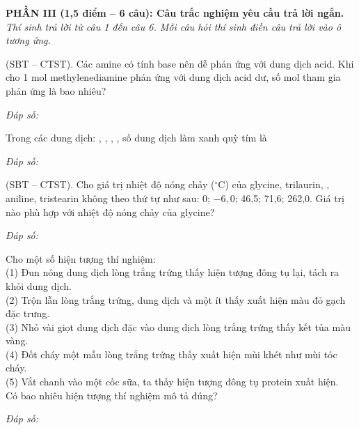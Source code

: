 \documentclass[11pt,a4paper]{article}
\def\loigiai#1{}
\begin{document}
\newpage

\vspace{0.15cm}
\noindent
\textbf{PHẦN III (1,5 điểm -- 6 câu): Câu trắc nghiệm yêu cầu trả lời ngắn.}\\
\textit{Thí sinh trả lời từ câu 1 đến câu 6. Mỗi câu hỏi thí sinh điền câu trả lời vào ô tương ứng.}

\setcounter{ex}{0}

\begin{ex}
(SBT -- CTST). Các amine có tính base nên dễ phản ứng với dung dịch acid. Khi cho 1 mol methylenediamine phản ứng với dung dịch acid  dư, số mol  tham gia phản ứng là bao nhiêu?
\loigiai{}
\end{ex}
\noindent\textit{Đáp số:} \dotfill\vspace{0.25cm}

\begin{ex}
Trong các dung dịch: , , , , số dung dịch làm xanh quỳ tím là
\loigiai{}
\end{ex}
\noindent\textit{Đáp số:} \dotfill\vspace{0.25cm}

\begin{ex}
(SBT -- CTST). Cho giá trị nhiệt độ nóng chảy ($^\circ$C) của glycine, trilaurin, , aniline, tristearin không theo thứ tự như sau: 0; $-6{,}0$; 46,5; 71,6; 262,0. Giá trị nào phù hợp với nhiệt độ nóng chảy của glycine?
\loigiai{}
\end{ex}
\noindent\textit{Đáp số:} \dotfill\vspace{0.25cm}

\begin{ex}
Cho một số hiện tượng thí nghiệm:\\
(1) Đun nóng dung dịch lòng trắng trứng thấy hiện tượng đông tụ lại, tách ra khỏi dung dịch.\\
(2) Trộn lẫn lòng trắng trứng, dung dịch  và một ít  thấy xuất hiện màu đỏ gạch đặc trưng.\\
(3) Nhỏ vài giọt dung dịch  đặc vào dung dịch lòng trắng trứng thấy kết tủa màu vàng.\\
(4) Đốt cháy một mẫu lòng trắng trứng thấy xuất hiện mùi khét như mùi tóc cháy.\\
(5) Vắt chanh vào một cốc sữa, ta thấy hiện tượng đông tụ protein xuất hiện.\\
Có bao nhiêu hiện tượng thí nghiệm mô tả đúng?
\loigiai{}
\end{ex}
\noindent\textit{Đáp số:} \dotfill\vspace{0.25cm}
\end{document}
